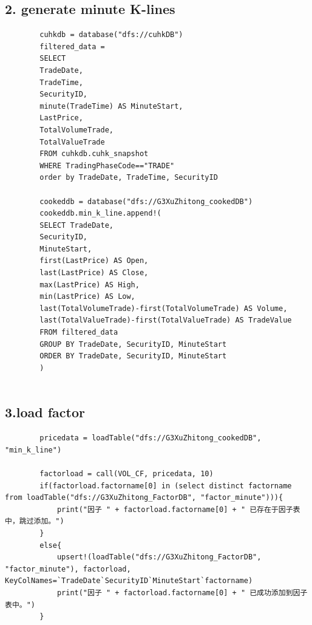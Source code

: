 \documentclass[10pt,a4paper]{article}
\begin{document}
	\subsection*{2. generate minute K-lines}
	\begin{lstlisting}
		cuhkdb = database("dfs://cuhkDB")
		filtered_data =
		SELECT 
		TradeDate,
		TradeTime,
		SecurityID,
		minute(TradeTime) AS MinuteStart, 
		LastPrice,
		TotalVolumeTrade,
		TotalValueTrade
		FROM cuhkdb.cuhk_snapshot
		WHERE TradingPhaseCode=="TRADE"
		order by TradeDate, TradeTime, SecurityID
		
		cookeddb = database("dfs://G3XuZhitong_cookedDB")
		cookeddb.min_k_line.append!(
		SELECT TradeDate,
		SecurityID,
		MinuteStart,
		first(LastPrice) AS Open,
		last(LastPrice) AS Close, 
		max(LastPrice) AS High,
		min(LastPrice) AS Low,
		last(TotalVolumeTrade)-first(TotalVolumeTrade) AS Volume,
		last(TotalValueTrade)-first(TotalValueTrade) AS TradeValue
		FROM filtered_data
		GROUP BY TradeDate, SecurityID, MinuteStart
		ORDER BY TradeDate, SecurityID, MinuteStart
		)
		
	\end{lstlisting}
	
	\subsection*{3.load factor}
	\begin{lstlisting}
		pricedata = loadTable("dfs://G3XuZhitong_cookedDB", "min_k_line")
		
		factorload = call(VOL_CF, pricedata, 10)
		if(factorload.factorname[0] in (select distinct factorname from loadTable("dfs://G3XuZhitong_FactorDB", "factor_minute"))){
			print("因子 " + factorload.factorname[0] + " 已存在于因子表中，跳过添加。")
		}
		else{
			upsert!(loadTable("dfs://G3XuZhitong_FactorDB", "factor_minute"), factorload, KeyColNames=`TradeDate`SecurityID`MinuteStart`factorname)
			print("因子 " + factorload.factorname[0] + " 已成功添加到因子表中。")
		}
	\end{lstlisting}
	
\end{document}
